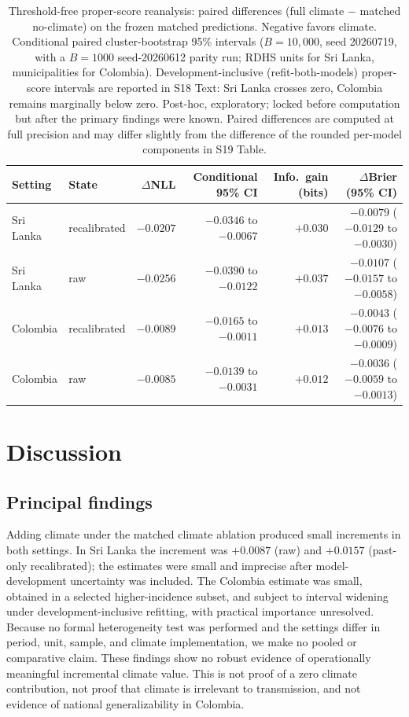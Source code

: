 \documentclass[11pt,a4paper]{article}
\begin{document}
\begin{table}[htbp]
\centering
\caption{Threshold-free proper-score reanalysis: paired differences (full climate $-$ matched no-climate) on the frozen matched predictions. Negative favors climate. Conditional paired cluster-bootstrap 95\% intervals ($B=10{,}000$, seed 20260719, with a $B=1000$ seed-20260612 parity run; RDHS units for Sri Lanka, municipalities for Colombia). Development-inclusive (refit-both-models) proper-score intervals are reported in S18 Text: Sri Lanka crosses zero, Colombia remains marginally below zero. Post-hoc, exploratory; locked before computation but after the primary findings were known. Paired differences are computed at full precision and may differ slightly from the difference of the rounded per-model components in S19 Table.}
\label{tab:properscore}
\footnotesize{}
\begin{tabularx}{\textwidth}{@{}llrrrr@{}}
\toprule
Setting & State & $\Delta$NLL & Conditional 95\% CI & Info.\ gain (bits) & $\Delta$Brier (95\% CI) \\
\midrule
Sri Lanka & recalibrated & $-0.0207$ & $-0.0346$ to $-0.0067$ & $+0.030$ & $-0.0079$ ($-0.0129$ to $-0.0030$) \\
Sri Lanka & raw & $-0.0256$ & $-0.0390$ to $-0.0122$ & $+0.037$ & $-0.0107$ ($-0.0157$ to $-0.0058$) \\
Colombia & recalibrated & $-0.0089$ & $-0.0165$ to $-0.0011$ & $+0.013$ & $-0.0043$ ($-0.0076$ to $-0.0009$) \\
Colombia & raw & $-0.0085$ & $-0.0139$ to $-0.0031$ & $+0.012$ & $-0.0036$ ($-0.0059$ to $-0.0013$) \\
\bottomrule
\end{tabularx}
\end{table}


\section{Discussion}

\subsection*{Principal findings}
Adding climate under the matched climate ablation produced small increments in both settings. In Sri Lanka the increment was $+0.0087$ (raw) and $+0.0157$ (past-only recalibrated); the estimates were small and imprecise after model-development uncertainty was included. The Colombia estimate was small, obtained in a selected higher-incidence subset, and subject to interval widening under development-inclusive refitting, with practical importance unresolved. Because no formal heterogeneity test was performed and the settings differ in period, unit, sample, and climate implementation, we make no pooled or comparative claim. These findings show no robust evidence of operationally meaningful incremental climate value. This is not proof of a zero climate contribution, not proof that climate is irrelevant to transmission, and not evidence of national generalizability in Colombia.
\end{document}
